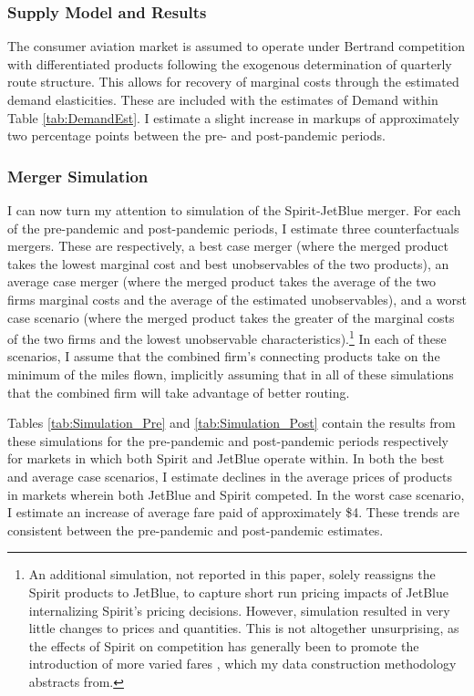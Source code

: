 \documentclass{article}
\begin{document}
	\subsubsection{Supply Model and Results}
	\label{sec:Analysis_Supply}
	The consumer aviation market is assumed to operate under Bertrand competition with differentiated products following the exogenous determination of quarterly route structure. This allows for recovery of marginal costs through the estimated demand elasticities.  These are included with the estimates of Demand within Table \ref{tab:DemandEst}. I estimate a slight increase in markups of approximately two percentage points between the pre- and post-pandemic periods. 
	
	
	\subsubsection{Merger Simulation}
	\label{sec:Analysis_Merger}
	I can now turn my attention to simulation of the Spirit-JetBlue merger. For each of the pre-pandemic and post-pandemic periods, I estimate three counterfactuals mergers. These are respectively, a best case merger (where the merged product takes the lowest marginal cost and best unobservables of the two products), an average case merger (where the merged product takes the average of the two firms marginal costs and the average of the estimated unobservables), and a worst case scenario (where the merged product takes the greater of the marginal costs of the two firms and the lowest unobservable characteristics).\footnote{An additional simulation, not reported in this paper, solely reassigns the Spirit products to JetBlue, to capture short run pricing impacts of JetBlue internalizing Spirit's pricing decisions. However, simulation resulted in very little changes to prices and quantities. This is not altogether unsurprising, as the effects of Spirit on competition has generally been to promote the introduction of more varied fares \citep{shrago_spirit_2024}, which my data construction methodology abstracts from.} In each of these scenarios, I assume that the combined firm's connecting products take on the minimum of the miles flown, implicitly assuming that in all of these simulations that the combined firm will take advantage of better routing. 

     
	 Tables \ref{tab:Simulation_Pre} and \ref{tab:Simulation_Post} contain the results from these simulations for the pre-pandemic and post-pandemic periods respectively for markets in which both Spirit and JetBlue operate within. In both the best and average case scenarios, I estimate declines in the average prices of products in markets wherein both JetBlue and Spirit competed. In the worst case scenario, I estimate an increase of average fare paid of approximately \$4. These trends are consistent between the pre-pandemic and post-pandemic estimates. 
\end{document}
